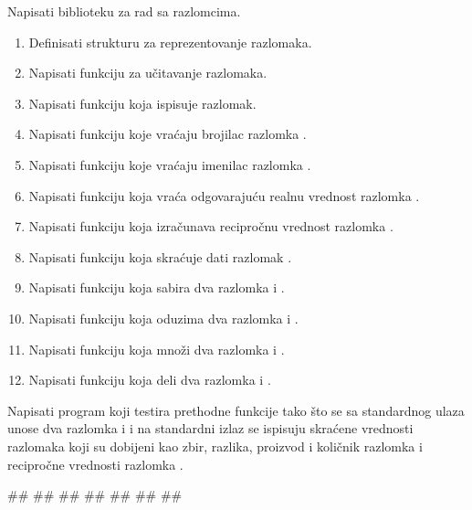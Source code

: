 \begin{Exercise}[label=1_04] %
Napisati biblioteku za rad sa razlomcima.

  \begin{enumerate}

  \item Definisati strukturu  za reprezentovanje razlomaka.
  \item Napisati funkciju  za učitavanje razlomaka.
  \item Napisati funkciju  koja ispisuje razlomak.
  \item Napisati funkciju  koje vraćaju brojilac razlomka .
   \item Napisati funkciju  koje vraćaju imenilac razlomka .
  \item Napisati funkciju  koja vraća odgovarajuću realnu vrednost razlomka .
  \item Napisati funkciju   koja izračunava recipročnu vrednost
    razlomka .
  \item Napisati funkciju  koja skraćuje dati razlomak .
  \item Napisati funkciju  koja sabira dva razlomka  i .
 \item Napisati funkciju  koja oduzima dva razlomka  i .
 \item Napisati funkciju  koja množi
    dva razlomka  i .
 \item Napisati funkciju  koja deli
    dva razlomka  i .
\end{enumerate}

Napisati program koji testira prethodne funkcije tako što se sa standardnog ulaza unose dva razlomka  i  i na standardni izlaz se ispisuju skraćene vrednosti razlomaka koji su dobijeni kao zbir, razlika, proizvod i količnik razlomka  i recipročne vrednosti razlomka .

\begin{maxitest}
\begin{upotreba}{1}
#\naslovInt#
##
##
##
##
##
##
\end{upotreba}
\end{maxitest}



\end{Exercise}
